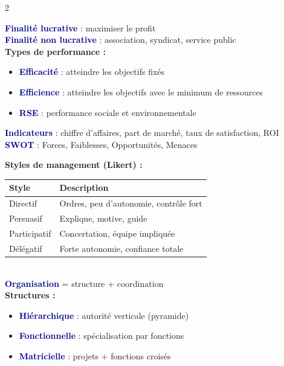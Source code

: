 \documentclass[a4paper,10pt]{article}
\newcommand{\key}[1]{\textbf{\textcolor{darkblue}{#1}}}
\begin{document}
\begin{multicols}{2}
\begin{tcolorbox}[basebox, colframe=green, title=8. MANAGEMENT — Finalité et performance]
\key{Finalité lucrative} : maximiser le profit \\
\key{Finalité non lucrative} : association, syndicat, service public \\[4pt]
\textbf{Types de performance :}
\begin{itemize}
  \item \key{Efficacité} : atteindre les objectifs fixés
  \item \key{Efficience} : atteindre les objectifs avec le minimum de ressources
  \item \key{RSE} : performance sociale et environnementale
\end{itemize}
\vspace{4pt}
\key{Indicateurs} : chiffre d'affaires, part de marché, taux de satisfaction, ROI \\[4pt]
\key{SWOT} : Forces, Faiblesses, Opportunités, Menaces
\end{tcolorbox}

\begin{tcolorbox}[basebox, colframe=orange, title=9. MANAGEMENT — Styles et organisation]
\textbf{Styles de management (Likert) :}
\begin{tabular}{ll}
\toprule
\textbf{Style} & \textbf{Description} \\
\midrule
Directif & Ordres, peu d'autonomie, contrôle fort \\
Persuasif & Explique, motive, guide \\
Participatif & Concertation, équipe impliquée \\
Délégatif & Forte autonomie, confiance totale \\
\bottomrule
\end{tabular}
\vspace{4pt}\\
\key{Organisation} = structure + coordination \\
\textbf{Structures :}
\begin{itemize}
  \item \key{Hiérarchique} : autorité verticale (pyramide)
  \item \key{Fonctionnelle} : spécialisation par fonctions
  \item \key{Matricielle} : projets + fonctions croisés
\end{itemize}
\end{tcolorbox}


\end{multicols}
\end{document}

